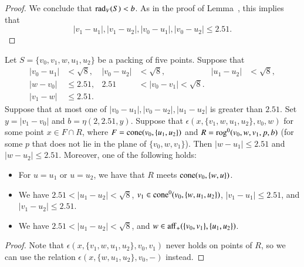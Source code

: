 \begin{tarskidata}
\begin{tarski}
\begin{proof}
We conclude that $\operatorname{rad}_V(S) < b$.
As in the proof of Lemma~,
this implies that
   $$
   |v_1-u_1|,|v_1-u_2|,|v_0-u_1|,|v_0-u_2| \le 2.51.
   $$
\end{proof}
\end{tarski}





\begin{tarski}

\begin{lemma}
 Let $S=\{v_0,v_1,w,u_1,u_2\}$ be a packing of five points.
Suppose that 
   $$
   \begin{array}{rlrlrll}
   |v_0-u_1|&<\sqrt8,& |v_0-u_2|&<\sqrt8,& |u_1-u_2|&<\sqrt8,\\
   |w-v_0|&\le 2.51, &2.51&<|v_0-v_1|<\sqrt8.\\
   |v_1-w|&\le 2.51.
   \end{array}
   $$
Suppose that at most one of $|v_0-u_1|,|v_0-u_2|,|u_1-u_2|$ is
greater than $2.51$.
%
Set $y=|v_1-v_0|$ and $b=\eta(2,2.51,y)$.
Suppose that $\epsilon(x,\{v_1,w,u_1,u_2\},v_0,w)$ for some point
$x\in F\cap R$, where $F={\operatorname{cone}}(v_0,\{u_1,u_2\})$ and
$R={\operatorname{rog}}^0(v_0,w,v_1,p,b)$ (for some $p$ that
does not lie in the plane of $\{v_0,w,v_1\}$).
Then $|w-u_1|\le 2.51$ and  $|w-u_2|\le 2.51$.
Moreover, one of the following holds:
  \begin{itemize}
  \item
  For $u=u_1$ or $u=u_2$, we have that
  $R$ meets ${\operatorname{cone}}(v_0,\{w,u\})$.
  \item  We have $2.51<|u_1-u_2|<\sqrt8$, 
  $v_1\in{\operatorname{cone}}^0(v_0,\{w,u_1,u_2\})$, 
  $|v_1-u_1|\le 2.51$, and $|v_1-u_2|\le 2.51$.
  \item  We have $2.51<|u_1-u_2|<\sqrt8$, and 
  $w\in{\operatorname{aff}}_+(\{v_0,v_1\},\{u_1,u_2\})$.
  \end{itemize}
\end{lemma}

\begin{proof}  
Note that $\epsilon(x,\{v_1,w,u_1,u_2\},v_0,v_1)$ never holds
on points of $R$, so we can use the relation
$\epsilon(x,\{w,u_1,u_2\},v_0,-)$ instead.


\end{proof}
\end{tarski}
\end{tarskidata}
